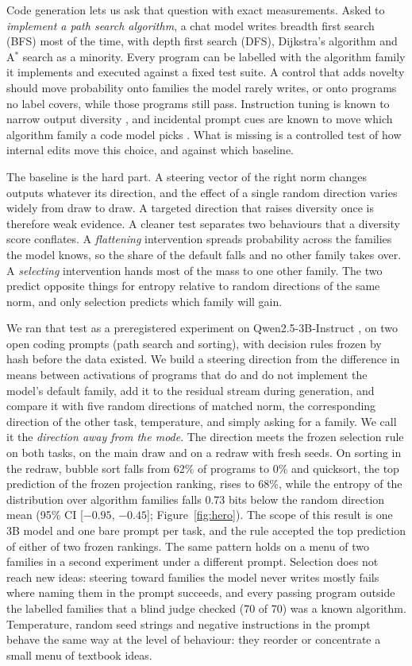 \documentclass[11pt,letterpaper]{article}
\newcommand{\Astar}{A$^{*}$}
\begin{document}
Code generation lets us ask that question with exact measurements. Asked to \emph{implement a path search algorithm}, a chat model writes breadth first search (BFS) most of the time, with depth first search (DFS), Dijkstra's algorithm and \Astar{} search as a minority. Every program can be labelled with the algorithm family it implements and executed against a fixed test suite. A control that adds novelty should move probability onto families the model rarely writes, or onto programs no label covers, while those programs still pass. Instruction tuning is known to narrow output diversity \citep{Kirk2023,Padmakumar2023,Zhang2025}, and incidental prompt cues are known to move which algorithm family a code model picks \citep{Narula2026}. What is missing is a controlled test of how internal edits move this choice, and against which baseline.

The baseline is the hard part. A steering vector of the right norm changes outputs whatever its direction, and the effect of a single random direction varies widely from draw to draw. A targeted direction that raises diversity once is therefore weak evidence. A cleaner test separates two behaviours that a diversity score conflates. A \emph{flattening} intervention spreads probability across the families the model knows, so the share of the default falls and no other family takes over. A \emph{selecting} intervention hands most of the mass to one other family. The two predict opposite things for entropy relative to random directions of the same norm, and only selection predicts which family will gain.

We ran that test as a preregistered experiment on Qwen2.5-3B-Instruct \citep{Yang2024}, on two open coding prompts (path search and sorting), with decision rules frozen by hash before the data existed. We build a steering direction from the difference in means between activations of programs that do and do not implement the model's default family, add it to the residual stream during generation, and compare it with five random directions of matched norm, the corresponding direction of the other task, temperature, and simply asking for a family. We call it the \emph{direction away from the mode}. The direction meets the frozen selection rule on both tasks, on the main draw and on a redraw with fresh seeds. On sorting in the redraw, bubble sort falls from 62\% of programs to 0\% and quicksort, the top prediction of the frozen projection ranking, rises to 68\%, while the entropy of the distribution over algorithm families falls 0.73 bits below the random direction mean (95\% CI [$-0.95$, $-0.45$]; Figure~\ref{fig:hero}). The scope of this result is one 3B model and one bare prompt per task, and the rule accepted the top prediction of either of two frozen rankings. The same pattern holds on a menu of two families in a second experiment under a different prompt. Selection does not reach new ideas: steering toward families the model never writes mostly fails where naming them in the prompt succeeds, and every passing program outside the labelled families that a blind judge checked (70 of 70) was a known algorithm. Temperature, random seed strings and negative instructions in the prompt behave the same way at the level of behaviour: they reorder or concentrate a small menu of textbook ideas.
\end{document}
